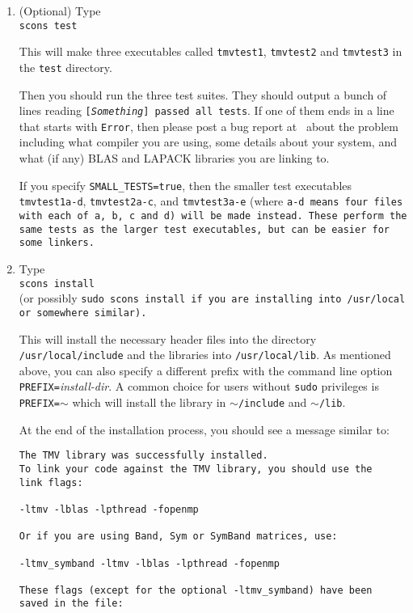 \begin{enumerate}
\item (Optional) Type\\
\texttt{scons test}

This will make three executables called \texttt{tmvtest1}, 
\texttt{tmvtest2} and \texttt{tmvtest3} in the \texttt{test} directory.

Then you should run the three test suites.
They should output a bunch of lines reading \texttt{[{\em Something}] passed all tests}.
If one of them ends in a line that starts with \texttt{Error}, 
then please post a bug report at \myissues\ about the problem including what compiler
you are using, some details about your system, and what (if any) BLAS and LAPACK
libraries you are linking to.

If you specify \texttt{SMALL\_TESTS=true}, then the smaller test executables
\texttt{tmvtest1a-d}, \texttt{tmvtest2a-c}, and \texttt{tmvtest3a-e} (where \tt{a-d} means 
four files with each of \tt{a}, \tt{b}, \tt{c} and \tt{d})
will be made instead.
These perform the same tests as the larger test executables, but can be easier
for some linkers.

\item Type\\
\texttt{scons install}\\
(or possibly \tt{sudo scons install} if you are installing into \tt{/usr/local} or somewhere similar).

This will install the necessary header files into the directory \texttt{/usr/local/include} and the libraries
into \texttt{/usr/local/lib}.  As mentioned above, you can also specify a different prefix 
with the command line option \texttt{PREFIX=}\emph{install-dir}.  A common choice for users
without \texttt{sudo} privileges is \texttt{PREFIX=$\sim$} which will install the library in \texttt{$\sim$/include}
and \texttt{$\sim$/lib}.

At the end of the installation process, you should see a message similar to:
\begin{verbatim}
The TMV library was successfully installed.  
To link your code against the TMV library, you should use the 
link flags: 

-ltmv -lblas -lpthread -fopenmp

Or if you are using Band, Sym or SymBand matrices, use: 

-ltmv_symband -ltmv -lblas -lpthread -fopenmp

These flags (except for the optional -ltmv_symband) have been
saved in the file:


\end{verbatim}
\end{enumerate}
